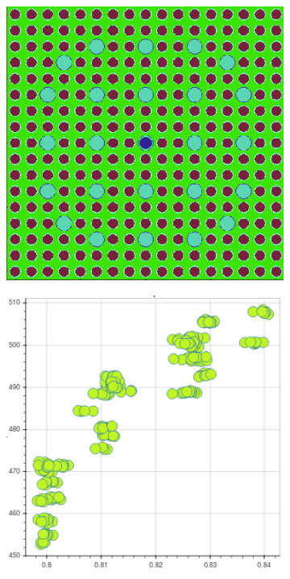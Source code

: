 \clearpage

\begin{figure}[h!]
\centering
\begin{subfigure}{0.45\textwidth}
  \centering
  \includegraphics[width=0.9\linewidth]{figures/unsupervised/features/assm-16/geometry}
  \caption{}
  \label{fig:chap10-capt-mean-pcm-geom}
\end{subfigure}%
\begin{subfigure}{0.45\textwidth}
  \centering
  \includegraphics[width=0.9\linewidth]{figures/unsupervised/features/assm-16/u238-capt/mean-pcm/mgxs}

\end{subfigure}
\end{figure}
